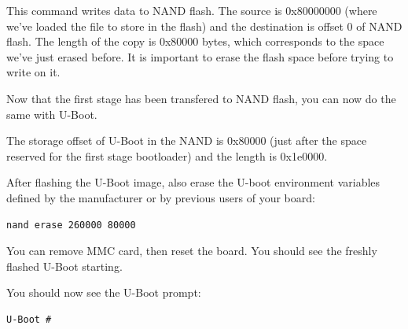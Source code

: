 This command writes data to NAND flash. The source is 0x80000000
(where we've loaded the file to store in the flash) and the
destination is offset 0 of NAND flash. The length of the copy is
0x80000 bytes, which corresponds to the space we've just erased
before. It is important to erase the flash space before trying to
write on it.

Now that the first stage has been transfered to NAND flash, you can
now do the same with U-Boot.

The storage offset of U-Boot in the NAND is 0x80000 (just after the
space reserved for the first stage bootloader) and the length is
0x1e0000.

After flashing the U-Boot image, also erase the U-boot environment
variables defined by the manufacturer or by previous users of your
board:

\begin{verbatim}
nand erase 260000 80000
\end{verbatim}

You can remove MMC card, then reset the board. You should see the
freshly flashed U-Boot starting.

You should now see the U-Boot prompt:

\begin{verbatim}
U-Boot #
\end{verbatim}

\clearpage


